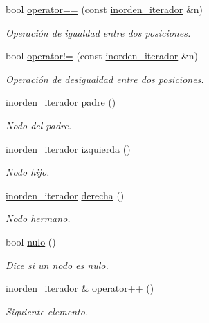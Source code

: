 \begin{DoxyCompactItemize}
\item 
bool \hyperlink{classArbolGeneral_1_1inorden__iterador_af19eeb8f37343e3f1c472f3f47818cac}{operator==} (const \hyperlink{classArbolGeneral_1_1inorden__iterador}{inorden\+\_\+iterador} \&n)
\begin{DoxyCompactList}\small\item\em Operación de igualdad entre dos posiciones. \end{DoxyCompactList}\item 
bool \hyperlink{classArbolGeneral_1_1inorden__iterador_a00c8e1e90772d16dc0c0e59c45f44fb6}{operator!=} (const \hyperlink{classArbolGeneral_1_1inorden__iterador}{inorden\+\_\+iterador} \&n)
\begin{DoxyCompactList}\small\item\em Operación de desigualdad entre dos posiciones. \end{DoxyCompactList}\item 
\hyperlink{classArbolGeneral_1_1inorden__iterador}{inorden\+\_\+iterador} \hyperlink{classArbolGeneral_1_1inorden__iterador_ae4b1e23e86b54e03288398f7dca60cea}{padre} ()
\begin{DoxyCompactList}\small\item\em Nodo del padre. \end{DoxyCompactList}\item 
\hyperlink{classArbolGeneral_1_1inorden__iterador}{inorden\+\_\+iterador} \hyperlink{classArbolGeneral_1_1inorden__iterador_acfcff093a9e0d3869ec180f053393e0c}{izquierda} ()
\begin{DoxyCompactList}\small\item\em Nodo hijo. \end{DoxyCompactList}\item 
\hyperlink{classArbolGeneral_1_1inorden__iterador}{inorden\+\_\+iterador} \hyperlink{classArbolGeneral_1_1inorden__iterador_a374dc7ff5ed5e568ca496f103cf73a5d}{derecha} ()
\begin{DoxyCompactList}\small\item\em Nodo hermano. \end{DoxyCompactList}\item 
bool \hyperlink{classArbolGeneral_1_1inorden__iterador_ab4f05a51c5ddba4ca127f2440a3e3963}{nulo} ()
\begin{DoxyCompactList}\small\item\em Dice si un nodo es nulo. \end{DoxyCompactList}\item 
\hyperlink{classArbolGeneral_1_1inorden__iterador}{inorden\+\_\+iterador} \& \hyperlink{classArbolGeneral_1_1inorden__iterador_adae1260c6d315f40e7e7128145d5ec08}{operator++} ()
\begin{DoxyCompactList}\small\item\em Siguiente elemento. \end{DoxyCompactList}\end{DoxyCompactItemize}
